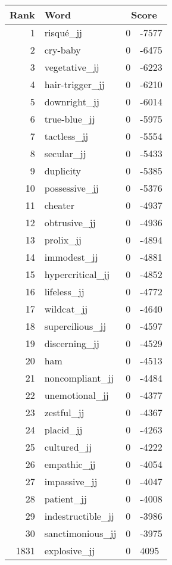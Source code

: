 \begin{longtable}[!htbp]{| rlr@{.}l |}
    \hline
    \textbf{Rank} & \textbf{Word} & \multicolumn{2}{c|}{\textbf{Score}} \\
    \hline
    \endhead
    1 & risqué\_jj & 0 & -7577 \\
    2 & cry-baby & 0 & -6475 \\
    3 & vegetative\_jj & 0 & -6223 \\
    4 & hair-trigger\_jj & 0 & -6210 \\
    5 & downright\_jj & 0 & -6014 \\
    6 & true-blue\_jj & 0 & -5975 \\
    7 & tactless\_jj & 0 & -5554 \\
    8 & secular\_jj & 0 & -5433 \\
    9 & duplicity & 0 & -5385 \\
    10 & possessive\_jj & 0 & -5376 \\
    11 & cheater & 0 & -4937 \\
    12 & obtrusive\_jj & 0 & -4936 \\
    13 & prolix\_jj & 0 & -4894 \\
    14 & immodest\_jj & 0 & -4881 \\
    15 & hypercritical\_jj & 0 & -4852 \\
    16 & lifeless\_jj & 0 & -4772 \\
    17 & wildcat\_jj & 0 & -4640 \\
    18 & supercilious\_jj & 0 & -4597 \\
    19 & discerning\_jj & 0 & -4529 \\
    20 & ham & 0 & -4513 \\
    21 & noncompliant\_jj & 0 & -4484 \\
    22 & unemotional\_jj & 0 & -4377 \\
    23 & zestful\_jj & 0 & -4367 \\
    24 & placid\_jj & 0 & -4263 \\
    25 & cultured\_jj & 0 & -4222 \\
    26 & empathic\_jj & 0 & -4054 \\
    27 & impassive\_jj & 0 & -4047 \\
    28 & patient\_jj & 0 & -4008 \\
    29 & indestructible\_jj & 0 & -3986 \\
    30 & sanctimonious\_jj & 0 & -3975 \\
    1831 & explosive\_jj & 0 & 4095 \\

\end{longtable}

